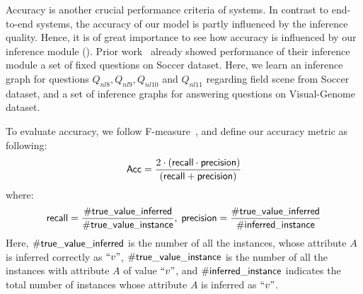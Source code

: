 Accuracy is another crucial performance criteria of \vqa systems. In contrast to end-to-end systems, the accuracy of our model is partly influenced by the inference quality. Hence, it is of great importance to see how accuracy is influenced by our inference module (). Prior work~\cite{peixi2019} already showed performance of their inference module \wrt a set of fixed questions on Soccer dataset. Here, we learn an inference graph for questions $Q_{nl8},Q_{nl9},Q_{nl10}$ and $Q_{nl11}$ regarding field scene from Soccer dataset, and a set of inference graphs for answering questions on Visual-Genome dataset. 

To evaluate accuracy, we follow F-measure~\cite{Fmeasure}, and define our accuracy metric as following:
\begin{equation*}
{\ensuremath {\mathsf{Acc}}}=\frac{2\cdot ({\mathsf{recall}}\cdot {\ensuremath {\mathsf{precision}}})}{({\mathsf{recall}}+{\mathsf{precision}})}
\end{equation*}
where:
\begin{equation*}
\scriptsize
{\ensuremath {\mathsf{recall}}}= \frac{\#{\mathsf{true}}\_{\mathsf{value}}\_{\mathsf{inferred}}}{\#{\mathsf{true}}\_{\mathsf{value}}\_{\mathsf{instance}}},~ {\mathsf{precision}}=\frac{\#{\mathsf{true}}\_{\mathsf{value}}\_{\mathsf{inferred}}}{\#{\mathsf{inferred}}\_{\mathsf{instance}}}
\end{equation*}
Here, $\#{\mathsf{true}}\_{\mathsf{value}}\_{\mathsf{inferred}}$ is the number of all the instances, whose attribute $A$ is inferred correctly as $``v"$,  $\#{\mathsf{true}}\_{\mathsf{value}}\_{\mathsf{instance}}$ is the number of all the instances with attribute $A$ of value $``v"$, and $\#{\mathsf{inferred}}\_{\mathsf{instance}}$ indicates the total number of instances whose attribute $A$ is inferred as $``v"$. 




